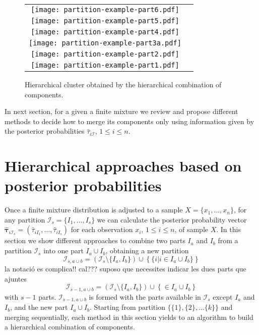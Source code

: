 \documentclass[10pt, a4paper]{article}
\newcommand{\m}[1]{\boldsymbol{#1}}
\begin{document}
\begin{figure}[thbp]
\begin{center}
\begin{tabular}{cc}
  \texttt{[image: partition-example-part6.pdf]} \\
    \texttt{[image: partition-example-part5.pdf]} \\
      \texttt{[image: partition-example-part4.pdf]} \\
        \texttt{[image: partition-example-part3a.pdf]} \\
          \texttt{[image: partition-example-part2.pdf]} \\
            \texttt{[image: partition-example-part1.pdf]}
 \end{tabular}
 \caption{Hierarchical cluster obtained by the hierarchical combination of components.}\label{hierarchical}
\end{center}
\end{figure}

In next section, for a given a finite mixture we review and propose different methods to decide how to merge its components only using information given by the posterior probabilities $\hat{\tau}_{i \mathcal{I}}$, $1\leq i \leq n$.

\section{Hierarchical approaches based on posterior probabilities}
\label{old_methods}

Once a finite mixture distribution is adjusted to a sample $X=\{x_1, \dots, x_n\}$, for any partition $\mathcal{I}_s = \{ I_1, \dots, I_s\}$ we can calculate the posterior probability vector  $\hat{\m\tau}_{i \mathcal{I}_s} = \left( \hat{\tau}_{i I_1} , \dots, \hat{\tau}_{i I_s}  \right)$ for each observation $x_i$, $1 \leq i \leq n$, of sample $X$. In this section we show different approaches to combine two parts $I_a$ and $I_b$ from a partition $\mathcal{I}_s$ into one part $I_a \cup I_b$, obtaining a new partition
\[
\mathcal{I}_{s, a \cup b} = \left( \mathcal{I}_s \setminus \{ I_a, I_b \} \right) \cup \left\{ \{ i | i \in I_a\cup I_b \} \right\}
\]
{\color{blue} la notaci\'{o} es complica!! cal??? suposo que necessites indicar les dues parts que ajuntes}
\[
\mathcal{I}_{s-1,a \cup b} = \left( \mathcal{I}_s \setminus \{ I_a, I_b \} \right) \cup \left\{ \in I_a\cup I_b \right\}
\]
with $s-1$ parts. $\mathcal{I}_{s-1,a \cup b}$ is formed with the parts available in $\mathcal{I}_{s}$ except $I_a$ and  $I_b$, and the new part $I_a \cup I_b$. Starting from partition $\{ \{1\}, \{2\}, \dots \{k\}\}$ and merging sequentially, each method in this section yields to an algorithm to build a hierarchical combination of components.
\end{document}

